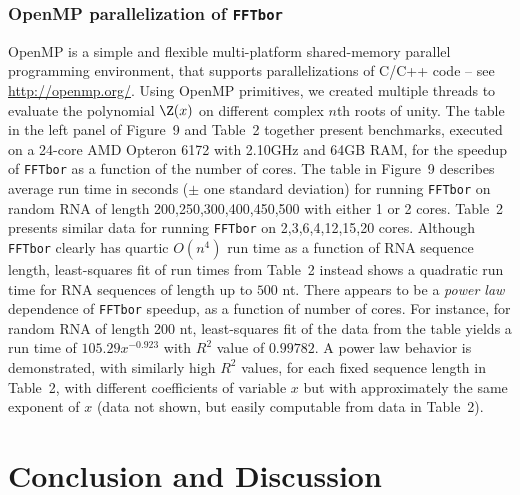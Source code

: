 \subsubsection*{OpenMP parallelization of {\tt FFTbor}}

OpenMP is a simple and flexible
multi-platform shared-memory parallel programming environment, that supports
parallelizations of C/C++ code -- see \url{http://openmp.org/}.
Using OpenMP primitives, we created multiple threads to evaluate the polynomial
$\Z(x)$ on different complex $n$th roots of unity. The table in the left
panel of Figure~9
and Table~2 together present benchmarks,
executed on
a 24-core AMD Opteron 6172 with 2.10GHz and 64GB RAM, for the speedup
of {\tt FFTbor} as a function of the number of cores.
The table in Figure~9 describes average
run time in seconds ($\pm$ one standard deviation) for running {\tt FFTbor}
on random RNA of length 200,250,300,400,450,500 with either 1 or 2 cores.
Table~2 presents similar data for running
{\tt FFTbor} on 2,3,6,4,12,15,20 cores.
Although {\tt FFTbor} clearly has quartic $O(n^4)$ run time as a function of
RNA sequence length, least-squares fit
of run times from
Table~2 instead
shows a quadratic
run time for RNA sequences of length up to $500$ nt. There appears to be
a {\em power law} dependence of {\tt FFTbor}
speedup, as a function of number of cores. For instance, for random RNA of
length 200 nt, least-squares fit of the data from the table yields
a run time of $105.29 x^{-0.923}$ with  $R^2$ value of
$0.99782$. A power law behavior is demonstrated, with similarly high
$R^2$ values, for each fixed sequence length in
Table~2, with different
coefficients of variable $x$ but with approximately the
same exponent of $x$ (data not shown, but easily computable from data in
Table~2).

\section*{Conclusion and Discussion}

